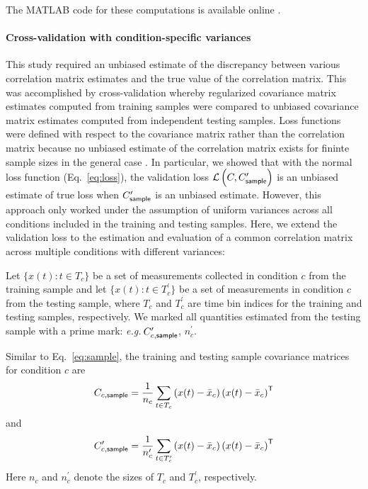\documentclass[10pt]{article}
\newcommand{\loss}[1]{\mathcal L\left(#1\right)}
\newcommand{\T}{{\sf T}}
\begin{document}
The MATLAB code for these computations is available online \cite{Yatsenko:2014c}.

\paragraph{Cross-validation with condition-specific variances}
This study required an unbiased estimate of the discrepancy between various correlation matrix estimates and the true value of the correlation matrix. This was accomplished by cross-validation whereby regularized covariance matrix estimates computed from training samples were compared to unbiased covariance matrix estimates computed from independent testing samples. Loss functions were defined with respect to the covariance matrix rather than the correlation matrix because no unbiased estimate of the correlation matrix exists for fininte sample sizes in the general case \cite{Fisher:1921}. In particular, we showed that with the normal loss function (Eq.~\ref{eq:loss}), the validation loss $\loss{C,C_{\sf sample}^\prime}$ is an unbiased estimate of true loss when $C_{\sf sample}^\prime$ is an unbiased estimate. However, this approach only worked under the assumption of uniform variances across all conditions included in the training and testing samples.  Here, we extend the validation loss to the estimation and evaluation of a common correlation matrix across multiple conditions with different variances:

Let $\{x(t):t\in T_c\}$ be a set of measurements collected in condition $c$ from the training sample and let $\{x(t):t \in T_c^\prime\}$ be a set of measurements in condition $c$ from the testing sample, where $T_c$ and $T_c^\prime$ are time bin indices for the training and testing samples, respectively. We marked all quantities estimated from the testing sample with a prime mark: \emph{e.g.}\,$C_{c,\sf sample}^\prime$, $n_c^\prime$.

Similar to Eq.~\ref{eq:sample}, the training and testing sample covariance matrices for condition $c$ are
\begin{equation}
	C_{c,{\sf sample}}
	= \frac 1{n_c} \sum\limits_{t\in T_c}\left(x(t)-\bar x_c\right)\left(x(t)-\bar x_c\right)^\T
\end{equation}
and
\begin{equation}
	C_{c,{\sf sample}}^\prime
	= \frac 1{n_c^\prime} \sum\limits_{t\in T_c^\prime}\left(x(t)-\bar x_c\right)\left(x(t)-\bar x_c\right)^\T
\end{equation}
Here $n_c$ and $n_c^\prime$ denote the sizes of $T_c$ and $T_c^\prime$, respectively. 
\end{document}
